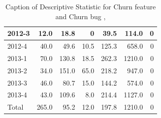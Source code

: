 \documentclass[UKenglish]{ifimaster}  %
\begin{document}
\begin{table}[!htbp]
\begin{adjustwidth}{-1.5cm}{}
{{\begin{tabular}{ | l | r | r | r | r | r | r | }
2012-3 & 12.0 & 18.8 & 0 & 39.5 & 114.0 & 0\\ \hline
2012-4 & 40.0 & 49.6 & 10.5 & 125.3 & 658.0 & 0\\ \hline
2013-1 & 70.0 & 130.8 & 18.5 & 262.3 & 1210.0 & 0\\ \hline
2013-2 & 34.0 & 151.0 & 65.0 & 218.2 & 947.0 & 0\\ \hline
2013-3 & 46.0 & 80.7 & 15.0 & 144.2 & 574.0 & 0\\ \hline
2013-4 & 43.0 & 109.6 & 8.0 & 214.4 & 1127.0 & 0\\ \hline
Total & 265.0 & 95.2 & 12.0 & 197.8 & 1210.0 & 0\\ \hline
\end{tabular}
}
}
\end{adjustwidth}
\caption[Optional caption for list of figures]{Caption of Descriptive Statistic for Churn feature and Churn bug , }
\label{DS:6:4}
\end{table}
\end{document}
